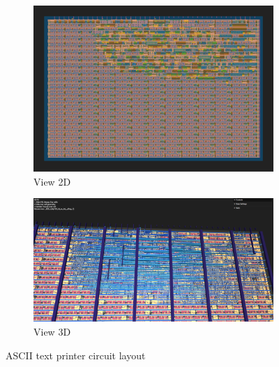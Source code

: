 \begin{figure}[H]
    \centering
    \begin{subfigure}[b]{0.45\textwidth}
        \includegraphics[width=\linewidth]{Pictures/Result_ASCII_2D_View.png}
        \caption{View 2D}\label{fig:ASCII_2D}
    \end{subfigure}
    \begin{subfigure}[b]{0.45\textwidth}
        \includegraphics[width=\linewidth]{Pictures/Result_ASCII_3D_View.png}
        \caption{View 3D}\label{fig:ASCII_3D}
    \end{subfigure}
    \caption{ASCII text printer circuit layout}\label{fig:ASCII_Layout}
\end{figure}

